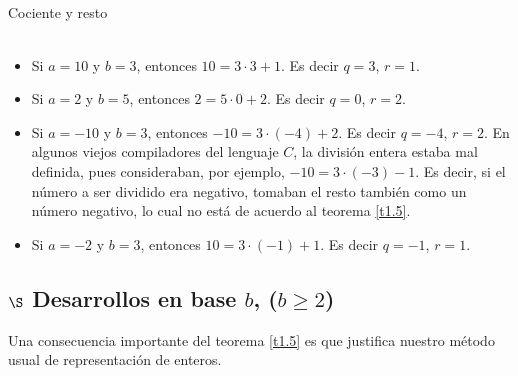 \begin{section}{Cociente y resto}
\begin{ejemplo} {} 
${}^{}$
\begin{itemize}
\item Si $a=10$ y $b=3$, entonces $10 = 3 \cdot 3 +1$. Es decir $q= 3$, $r=1$. 
\item Si $a=2$ y $b=5$, entonces $2 = 5 \cdot 0 +2$. Es decir $q= 0$, $r=2$. 
\item Si $a=-10$ y $b=3$, entonces $-10 = 3 \cdot (-4) +2$. Es decir $q= -4$, $r=2$. En algunos viejos compiladores del lenguaje $C$, la división entera estaba mal definida, pues consideraban, por ejemplo, $-10 = 3 \cdot (-3) -1$. Es decir, si el número a ser dividido era negativo, tomaban el resto también como un número negativo, lo cual no está de acuerdo al teorema \ref{t1.5}.  
\item Si $a=-2$ y $b=3$, entonces $10 = 3 \cdot (-1) +1$. Es decir $q= -1$, $r=1$. 
\end{itemize}
\end{ejemplo}




\subsection*{\Large $\S$ Desarrollos en base $b$, ($b \ge 2$)}
	
	
Una consecuencia importante del teorema \ref{t1.5} es que
justifica nuestro método usual de representación de enteros. 


\end{section}

